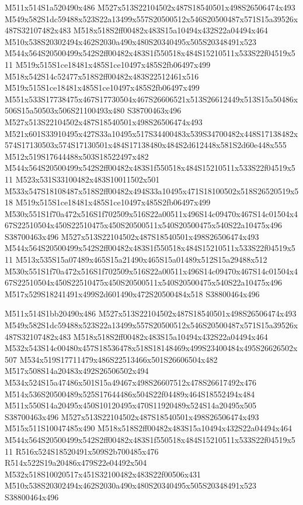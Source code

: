 \documentclass{article}
\begin{document}
\begin{multicols}{2}
M511x514S1a520490x486 M527x513S22104502x487S18540501x498S26506474x493 M549x582S1dc59488x523S22a13499x557S20500512x546S20500487x571S15a39526x487S32107482x483 M518x518S2ff00482x483S15a10494x432S22a04494x464 M510x538S20302494x462S2030a490x480S20340495x505S20348491x523 M544x564S20500499x542S2ff00482x483S1f550518x484S15210511x533S22f04519x511 M519x515S1ce18481x485S1ce10497x485S2fb06497x499 M518x542S14c52477x518S2ff00482x483S22512461x516 M519x515S1ce18481x485S1ce10497x485S2fb06497x499 M551x533S17738475x467S17730504x467S26606521x513S26612449x513S15a50486x506S15a50503x506S21100493x480 S38700463x496 M527x513S22104502x487S18540501x498S26506474x493 M521x601S33910495x427S33a10495x517S34400483x539S34700482x448S17138482x574S17130503x574S17130501x484S17138480x484S2d612448x581S2d60e448x555 M512x519S17644488x503S18522497x482 M544x564S20500499x542S2ff00482x483S1f550518x484S15210511x533S22f04519x511 M523x531S33100482x483S10011502x501 M533x547S18108487x518S2ff00482x494S33a10495x471S18100502x518S26520519x518 M519x515S1ce18481x485S1ce10497x485S2fb06497x499 M530x551S1f70a472x516S1f702509x516S22a00511x496S14c09470x467S14c01504x467S22510504x450S22510475x450S20500511x540S20500475x540S22a10475x496 S38700463x496 M527x513S22104502x487S18540501x498S26506474x493 M544x564S20500499x542S2ff00482x483S1f550518x484S15210511x533S22f04519x511 M513x535S15a07489x465S15a21490x465S15a01489x512S15a29488x512 M530x551S1f70a472x516S1f702509x516S22a00511x496S14c09470x467S14c01504x467S22510504x450S22510475x450S20500511x540S20500475x540S22a10475x496 M517x529S18241491x499S2d601490x472S20500484x518 S38800464x496

M511x514S1bb20490x486 M527x513S22104502x487S18540501x498S26506474x493 M549x582S1dc59488x523S22a13499x557S20500512x546S20500487x571S15a39526x487S32107482x483 M518x518S2ff00482x483S15a10494x432S22a04494x464 M532x543S14c00480x457S18536478x518S18148469x499S23400484x495S26626502x507 M534x519S17711479x486S22513466x501S26606504x482 M517x508S14a20483x492S26506502x494 M534x524S15a47486x501S15a49467x498S26607512x478S26617492x476 M514x536S20500489x525S17644486x504S22f04489x464S18552494x484 M511x550S14a20495x450S10120495x470S11920489x524S14a20495x505 S38700463x496 M527x513S22104502x487S18540501x498S26506474x493 M515x511S10047485x490 M518x518S2ff00482x483S15a10494x432S22a04494x464 M544x564S20500499x542S2ff00482x483S1f550518x484S15210511x533S22f04519x511 R516x524S18520491x509S2b700485x476 R514x522S19a20486x479S22e04492x504 M532x518S10020517x451S32100482x483S22f00506x431 M510x538S20302494x462S2030a490x480S20340495x505S20348491x523 S38800464x496


\end{multicols}
\end{document}
